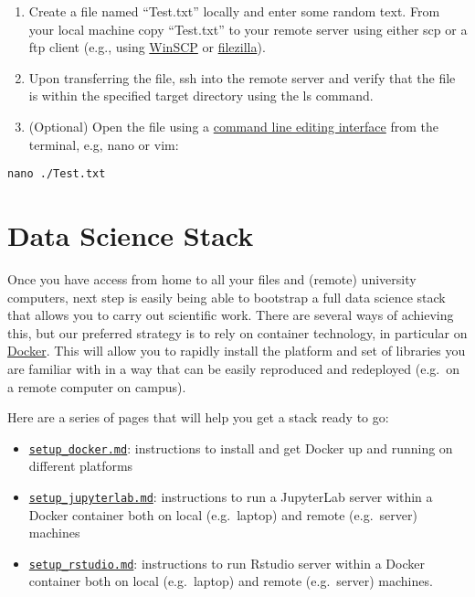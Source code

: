 \documentclass[
]{book}
\providecommand{\tightlist}{%
  \setlength{\itemsep}{0pt}\setlength{\parskip}{0pt}}
\begin{document}
\begin{enumerate}
\def\labelenumi{\arabic{enumi})}
\tightlist
\item
  Create a file named ``Test.txt'' locally and enter some random text.
  From your local machine copy ``Test.txt'' to your remote server using either
  scp or a ftp client (e.g., using \href{https://winscp.net/eng/index.php}{WinSCP}
  or \href{https://filezilla-project.org/}{filezilla}).
\item
  Upon transferring the file, ssh into the remote server and verify that the file is within the
  specified target directory using the ls command.
\item
  (Optional) Open the file using a
  \href{https://en.wikipedia.org/wiki/List_of_text_editors}{command line editing interface} from the terminal, e.g, nano or vim:
\end{enumerate}

\begin{verbatim}
nano ./Test.txt
\end{verbatim}

\hypertarget{data-science-stack}{%
\chapter{Data Science Stack}\label{data-science-stack}}

Once you have access from home to all your files and (remote) university computers, next step is easily being able to bootstrap a full data science stack that allows you to carry out scientific work. There are several ways of achieving this, but our preferred strategy is to rely on container technology, in particular on \href{https://www.docker.com/}{Docker}. This will allow you to rapidly install the platform and set of libraries you are familiar with in a way that can be easily reproduced and redeployed (e.g.~on a remote computer on campus).

Here are a series of pages that will help you get a stack ready to go:

\begin{itemize}
\tightlist
\item
  \href{06_docker.md}{\texttt{setup\_docker.md}}: instructions to install and get Docker
  up and running on different platforms
\item
  \href{07_jupyterlab.md}{\texttt{setup\_jupyterlab.md}}: instructions to run a JupyterLab server within a Docker container both on local (e.g.~laptop) and remote (e.g.~server) machines
\item
  \href{08_RStudio.md}{\texttt{setup\_rstudio.md}}: instructions to run Rstudio server within a Docker container both on local (e.g.~laptop) and remote (e.g.~server) machines.
\end{itemize}
\end{document}
